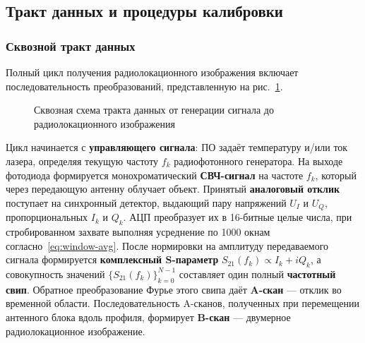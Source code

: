 \subsection{Тракт данных и процедуры калибровки}
\label{sec:calibration}

\subsubsection{Сквозной тракт данных}

Полный цикл получения радиолокационного изображения включает
последовательность преобразований, представленную на
рис.~\ref{fig:data-pipeline}.

\begin{figure}[H]
    \centering
    \caption{Сквозная схема тракта данных от генерации сигнала до
    радиолокационного изображения}
    \label{fig:data-pipeline}
\end{figure}

Цикл начинается с \textbf{управляющего сигнала}: ПО задаёт температуру и/или
ток лазера, определяя текущую частоту $f_k$ радиофотонного генератора. На
выходе фотодиода формируется монохроматический \textbf{СВЧ-сигнал} на частоте
$f_k$, который через передающую антенну облучает объект. Принятый
\textbf{аналоговый отклик} поступает на синхронный детектор, выдающий пару
напряжений $U_I$ и $U_Q$, пропорциональных $I_k$ и $Q_k$. АЦП преобразует
их в 16-битные целые числа, при стробированном захвате выполняя усреднение
по 1000 окнам согласно~\eqref{eq:window-avg}. После нормировки на амплитуду
передаваемого сигнала формируется \textbf{комплексный S-параметр}
$S_{21}(f_k) \propto I_k + iQ_k$, а совокупность значений
$\{S_{21}(f_k)\}_{k=0}^{N-1}$ составляет один полный \textbf{частотный свип}.
Обратное преобразование Фурье этого свипа даёт \textbf{A-скан} --- отклик во
временной области. Последовательность A-сканов, полученных при перемещении
антенного блока вдоль профиля, формирует \textbf{B-скан} --- двумерное
радиолокационное изображение.

